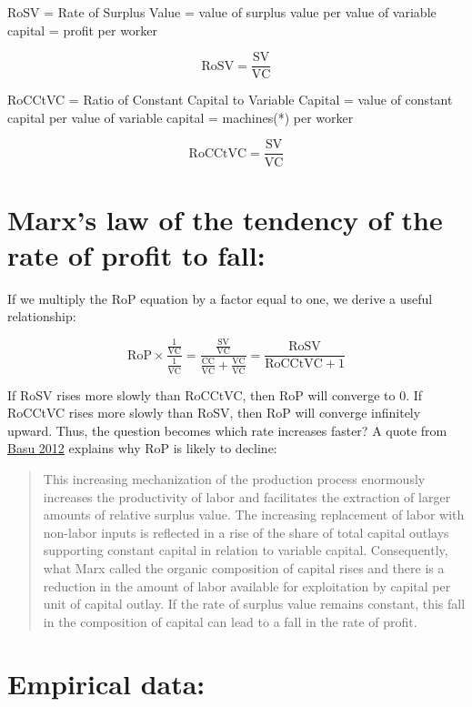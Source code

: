 \documentclass[a4paper]{article}
\begin{document}
RoSV = Rate of Surplus Value = value of surplus value per value of variable capital = profit per worker

\[ \text{RoSV} = \frac{\text{SV}}{\text{VC}} \]

RoCCtVC = Ratio of Constant Capital to Variable Capital = value of constant capital per value of variable capital = machines(*) per worker

\[ \text{RoCCtVC} = \frac{\text{SV}}{\text{VC}} \]

\section{Marx's law of the tendency of the rate of profit to fall:}

If we multiply the RoP equation by a factor equal to one, we derive a useful relationship:

\[ \text{RoP} \times \frac{\frac{1}{\text{VC}}}{\frac{1}{\text{VC}}} = \frac{\frac{\text{SV}}{\text{VC}}}{\frac{\text{CC}}{\text{VC}} + \frac{\text{VC}}{\text{VC}}}  = \frac{\text{RoSV}}{\text{RoCCtVC} + 1} \]

If RoSV rises more slowly than RoCCtVC, then RoP will converge to 0. If RoCCtVC rises more slowly than RoSV, then RoP will converge infinitely upward. Thus, the question becomes which rate increases faster? A quote from \href{https://content.csbs.utah.edu/~mli/Economics\%207004/Basu-tendency\%20for\%20the\%20rate\%20of\%20profit\%20to\%20fall.pdf}{Basu 2012} explains why RoP is likely to decline:

\begin{quote}
This increasing mechanization of the production process enormously increases the productivity of labor and facilitates the extraction of larger amounts of relative surplus value. The increasing replacement of labor with non-labor inputs is reflected in a rise of the share of total capital outlays supporting constant capital in relation to variable capital. Consequently, what Marx called the organic composition of capital rises and there is a reduction in the amount of labor available for exploitation by capital per unit of capital outlay. If the rate of surplus value remains constant, this fall in the composition of capital can lead to a fall in the rate of profit.
\end{quote}

\section{Empirical data:}
\end{document}
